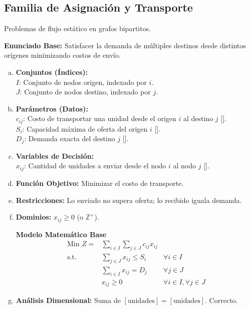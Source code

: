\documentclass{article}
\begin{document}
	\newpage
	
	\subsection{Familia de Asignación y Transporte}
	Problemas de flujo estático en grafos bipartitos.
	
	\textbf{Enunciado Base:} Satisfacer la demanda de múltiples destinos desde distintos orígenes minimizando costos de envío.
	
	\begin{enumerate}[a)]
		\item \textbf{Conjuntos (Índices):}\\
		$I$: Conjunto de nodos origen, indexado por $i$.\\
		$J$: Conjunto de nodos destino, indexado por $j$.
		
		\item \textbf{Parámetros (Datos):}\\
		$c_{ij}$: Costo de transportar una unidad desde el origen $i$ al destino $j$ [].\\
		$S_i$: Capacidad máxima de oferta del origen $i$ [].\\
		$D_j$: Demanda exacta del destino $j$ [].
		
		\item \textbf{Variables de Decisión:}\\
		$x_{ij}$: Cantidad de unidades a enviar desde el nodo $i$ al nodo $j$ [].
		\item \textbf{Función Objetivo:} Minimizar el costo de transporte.
		\item \textbf{Restricciones:} Lo enviado no supera oferta; lo recibido iguala demanda.
		\item \textbf{Dominios:} $x_{ij} \geq 0$ (o $\mathbb{Z}^+$).
		
		\begin{center}
			\textbf{Modelo Matemático Base}
			$$\begin{aligned}
				\text{Min } Z = & \sum_{i \in I} \sum_{j \in J} c_{ij} x_{ij} \\
				\text{s.t.} \quad & \sum_{j \in J} x_{ij} \leq S_i & \forall i \in I \\
				& \sum_{i \in I} x_{ij} = D_j & \forall j \in J \\
				& x_{ij} \geq 0 & \forall i \in I, \forall j \in J
			\end{aligned}$$
		\end{center}
		
		\item \textbf{Análisis Dimensional:} Suma de $[\text{unidades}] = [\text{unidades}]$. Correcto.
	\end{enumerate}
	
\end{document}
